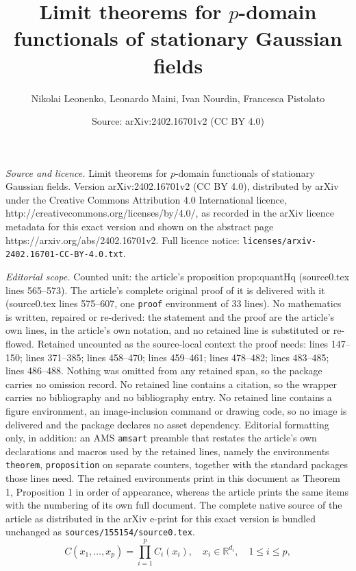 \documentclass[10pt,a4paper]{amsart}
\title{Limit theorems for $p$-domain functionals of stationary Gaussian fields}
\author{Nikolai Leonenko, Leonardo Maini, Ivan Nourdin, Francesca Pistolato}
\date{Source: arXiv:2402.16701v2 (CC BY 4.0)}
\newcommand{\R}{\mathbb{R}}
\begin{document}
\maketitle

\noindent\emph{Source and licence.} Limit theorems for $p$-domain functionals of stationary Gaussian fields. Version arXiv:2402.16701v2 (CC BY 4.0), distributed by arXiv under the Creative Commons Attribution 4.0 International licence, http://creativecommons.org/licenses/by/4.0/, as recorded in the arXiv licence metadata for this exact version and shown on the abstract page https://arxiv.org/abs/2402.16701v2. Full licence notice: \texttt{licenses/arxiv-2402.16701-CC-BY-4.0.txt}.\par\smallskip

\noindent\textit{Editorial scope.} Counted unit: the article's proposition prop:quantHq (source0.tex lines 565--573). The article's complete original proof of it is delivered with it (source0.tex lines 575--607, one \texttt{proof} environment of 33 lines). No mathematics is written, repaired or re-derived: the statement and the proof are the article's own lines, in the article's own notation, and no retained line is substituted or re-flowed.  Retained uncounted as the source-local context the proof needs: lines 147--150; lines 371--385; lines 458--470; lines 459--461; lines 478--482; lines 483--485; lines 486--488.  Nothing was omitted from any retained span, so the package carries no omission record.  No retained line contains a citation, so the wrapper carries no bibliography and no bibliography entry.  No retained line contains a figure environment, an image-inclusion command or drawing code, so no image is delivered and the package declares no asset dependency.  Editorial formatting only, in addition: an AMS \texttt{amsart} preamble that restates the article's own declarations and macros used by the retained lines, namely the environments \texttt{theorem}, \texttt{proposition} on separate counters, together with the standard packages those lines need.  The retained environments print in this document as Theorem 1, Proposition 1 in order of appearance, whereas the article prints the same items with the numbering of its own full document.  The complete native source of the article as distributed in the arXiv e-print for this exact version is bundled unchanged as \texttt{sources/155154/source0.tex}.
\begin{equation}
    \label{equ:sep}
    C(x_1,\ldots,x_p)= \prod_{i=1}^p C_i(x_i),\quad x_i\in \R^{d_i},\quad 1\leq i\leq p,
\end{equation}
\end{document}
